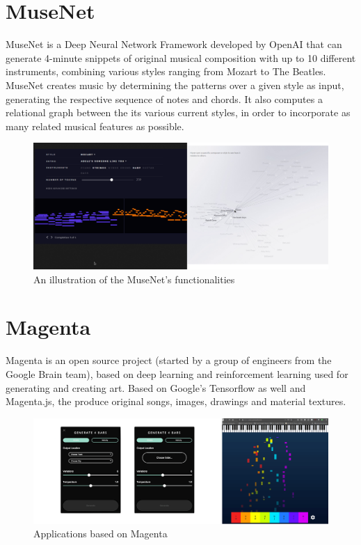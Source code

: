 \section{MuseNet}

MuseNet is a Deep Neural Network Framework developed by OpenAI that can generate 4-minute snippets of original musical composition
with up to 10 different instruments, combining various styles ranging from Mozart to The Beatles.
MuseNet creates music by determining the patterns over a given style as input, generating  the respective sequence of notes and chords. It also computes a relational graph between the its various current styles, in order to incorporate as many related musical features as possible.

\begin{figure}[H]
	\centering
	\includegraphics[width = 7.0in]{images/musenet.png}
	\caption{An illustration of the MuseNet's functionalities}
\label{musenet}
\end{figure}

\section{Magenta}

Magenta is an open source project (started by a group of engineers from the Google Brain team), based on deep learning and reinforcement learning used for generating
and creating art. Based on Google's Tensorflow as well and Magenta.js, the produce original songs, images, drawings and material textures.

\begin{figure}[H]
	\centering
	\includegraphics[width = 7.0in]{images/magenta.png}
	\caption{Applications based on Magenta}
\label{magenta}
\end{figure}
